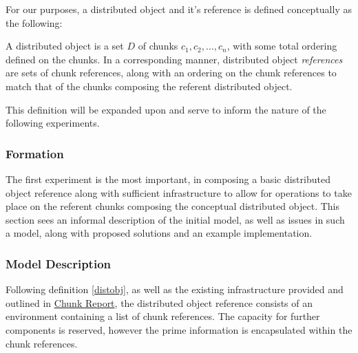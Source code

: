 For our purposes, a distributed object and it's reference is defined
conceptually as the following:

\begin{definition}
	\label{distobj}
	A distributed object is a set \(D\) of chunks \(c_1, c_2, \dots, c_n\),
	with some total ordering defined on the chunks. 
	In a corresponding manner, distributed object \textit{references} are
	sets of chunk references, along with an ordering on the chunk
	references to match that of the chunks composing the referent
	distributed object.
\end{definition}

This definition will be expanded upon and serve to inform the nature of the
following experiments.

\subsubsection{Formation}

The first experiment is the most important, in composing a basic distributed
object reference along with sufficient infrastructure to allow for operations
to take place on the referent chunks composing the conceptual distributed
object.
This section sees an informal description of the initial model, as well as
issues in such a model, along with proposed solutions and an example
implementation.

\subsubsection{Model Description}

Following definition \cref{distobj}, as well as the existing infrastructure
provided and outlined in \href{chunk-report.pdf}{Chunk Report}, the distributed
object reference consists of an environment containing a list of chunk
references.
The capacity for further components is reserved, however the prime information
is encapsulated within the chunk references.

